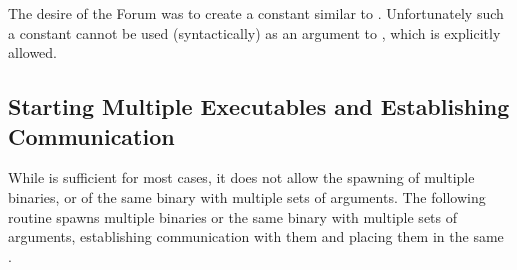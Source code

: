 \begin{rationale}
The desire of the Forum was to create a constant 
similar to . Unfortunately such a constant cannot
be used (syntactically) as an argument to ,
which is explicitly allowed.
\end{rationale}



\subsection{Starting Multiple Executables and Establishing Communication}
\label{subsec:multiple}

While  is sufficient for most cases, it does
not allow the spawning of multiple binaries, or of the same
binary with multiple sets of arguments.
The following routine spawns multiple binaries or the same binary
with multiple sets of arguments, establishing communication with them
and placing them in the same  .

